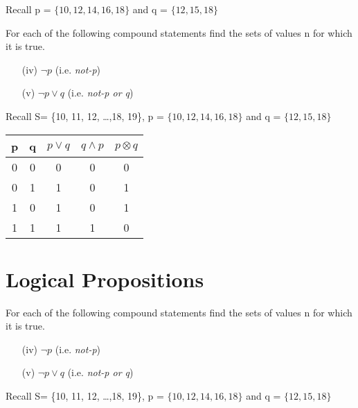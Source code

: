 \documentclass[12pt]{article}
\begin{document}
Recall p = $\{10,12,14,16,18\}$  and q = $\{12,15,18\}$


For each of the following compound statements find the sets of values n for which it is true. %
\begin{itemize}
\item[(iv)] $\neg p $  (i.e. \textit{not-p}) %
\item[(v)] $\neg p \vee q$  (i.e. \textit{not-p or q}) %
\end{itemize}

Recall S= \{10, 11, 12, \ldots ,18, 19\}, p = $\{10,12,14,16,18\}$  and q = $\{12,15,18\}$




\begin{center}
\begin{tabular}{|c|c|c|c|c|}
\hline
p & q & $p \vee q$ & $q \wedge p$ & $p \otimes q$ \\
\hline
0 & 0 & 0 & 0 & 0 \\
0 & 1 & 1 & 0 & 1\\
1 & 0 & 1 & 0 & 1 \\
1 & 1 & 1 & 1 & 0\\
\hline
\end{tabular}
\end{center}



\section{Logical Propositions}

For each of the following compound statements find the sets of values n for which it is true. %
\begin{itemize}
\item[(iv)] $\neg p $  (i.e. \textit{not-p}) %
\item[(v)] $\neg p \vee q$  (i.e. \textit{not-p or q}) %
\end{itemize}
Recall S= \{10, 11, 12, \ldots ,18, 19\}, p = $\{10,12,14,16,18\}$  and q = $\{12,15,18\}$
\end{document}
